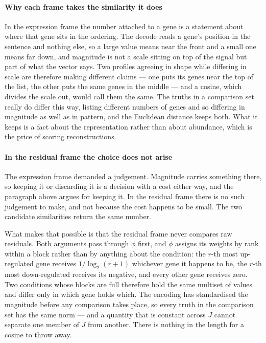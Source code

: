 \paragraph{Why each frame takes the similarity it does} 
In the expression frame the number attached to a gene is a statement about where
that gene sits in the ordering. The decode reads a gene's position in the
sentence and nothing else, so a large value means near the front and a small one
means far down, and magnitude is not a scale sitting on top of the signal but
part of what the vector says. Two profiles agreeing in shape while differing in
scale are therefore making different claims --- one puts its genes near the top
of the list, the other puts the same genes in the middle --- and a cosine, which
divides the scale out, would call them the same. The truths in a comparison set
really do differ this way, listing different numbers of genes and so differing in
magnitude as well as in pattern, and the Euclidean distance keeps both. What it
keeps is a fact about the representation rather than about abundance, which is
the price of scoring reconstructions.

\paragraph{In the residual frame the choice does not arise} The expression frame
demanded a judgement. Magnitude carries something there, so keeping it or
discarding it is a decision with a cost either way, and the paragraph above
argues for keeping it. In the residual frame there is no such judgement to make,
and not because the cost happens to be small. The two candidate similarities
return the same number.

What makes that possible is that the residual frame never compares raw residuals.
Both arguments pass through $\phi$ first, and $\phi$ assigns its weights by rank
within a block rather than by anything about the condition: the $r$-th most
up-regulated gene receives $1/\log_2(r+1)$ whichever gene it happens to be, the
$r$-th most down-regulated receives its negative, and every other gene receives
zero. Two conditions whose blocks are full therefore hold the same multiset of
values and differ only in which gene holds which. The encoding has standardised
the magnitude before any comparison takes place, so every truth in the comparison
set has the same norm --- and a quantity that is constant across $J$ cannot
separate one member of $J$ from another. There is nothing in the length for a
cosine to throw away.

